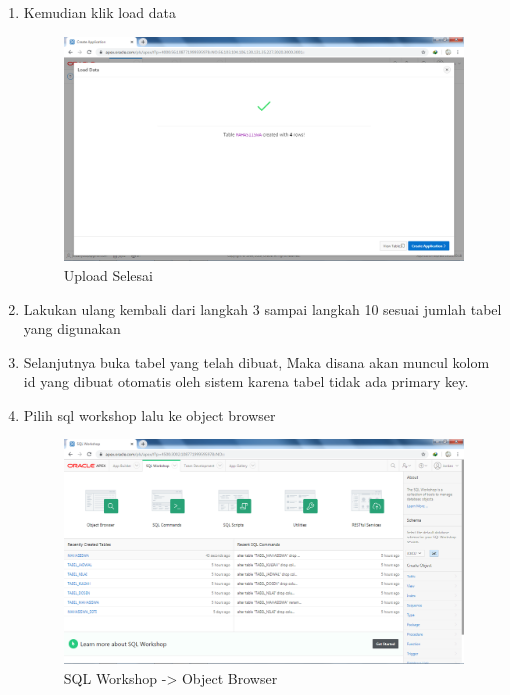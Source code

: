 \begin{enumerate}
\item Kemudian klik load data
\begin{figure}[H]
\centering
\caption{Upload Selesai}
\includegraphics[width=1\textwidth]{figures/8.png}
\end{figure}

\item Lakukan ulang kembali dari langkah 3 sampai langkah 10 sesuai jumlah tabel yang digunakan

\item Selanjutnya buka tabel yang telah dibuat, Maka disana akan muncul kolom id yang dibuat otomatis oleh sistem karena tabel tidak ada primary key.

\item Pilih sql workshop lalu ke object browser
\begin{figure}[H]
\centering
\caption{SQL Workshop -> Object Browser}
\includegraphics[width=1\textwidth]{figures/9.png}
\end{figure}


\end{enumerate}
